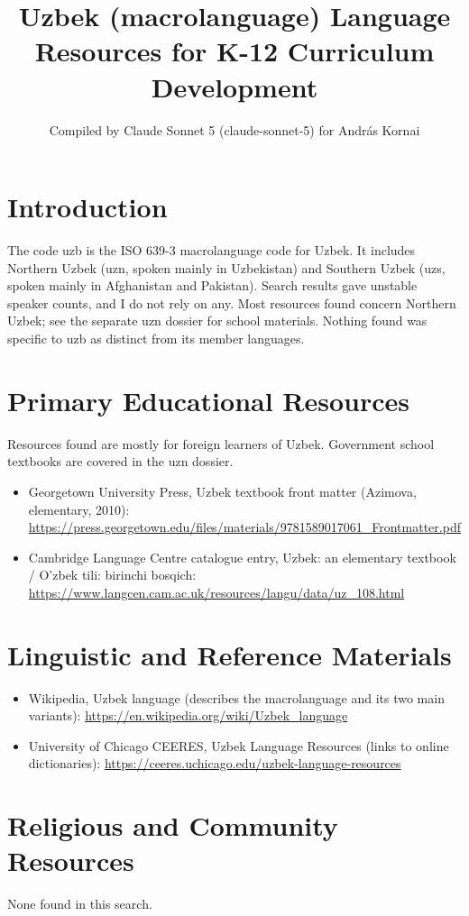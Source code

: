 \documentclass[12pt]{article}
\title{Uzbek (macrolanguage) Language Resources for K-12 Curriculum Development}
\author{Compiled by Claude Sonnet 5 (claude-sonnet-5) for Andr\'as Kornai}
\date{}
\begin{document}
\maketitle

\section{Introduction}
The code uzb is the ISO 639-3 macrolanguage code for Uzbek. It includes Northern Uzbek (uzn, spoken mainly in Uzbekistan) and Southern Uzbek (uzs, spoken mainly in Afghanistan and Pakistan). Search results gave unstable speaker counts, and I do not rely on any. Most resources found concern Northern Uzbek; see the separate uzn dossier for school materials. Nothing found was specific to uzb as distinct from its member languages.

\section{Primary Educational Resources}
Resources found are mostly for foreign learners of Uzbek. Government school textbooks are covered in the uzn dossier.
\begin{itemize}
\item Georgetown University Press, Uzbek textbook front matter (Azimova, elementary, 2010): \url{https://press.georgetown.edu/files/materials/9781589017061_Frontmatter.pdf}
\item Cambridge Language Centre catalogue entry, Uzbek: an elementary textbook / O'zbek tili: birinchi bosqich: \url{https://www.langcen.cam.ac.uk/resources/langu/data/uz_108.html}
\end{itemize}

\section{Linguistic and Reference Materials}
\begin{itemize}
\item Wikipedia, Uzbek language (describes the macrolanguage and its two main variants): \url{https://en.wikipedia.org/wiki/Uzbek_language}
\item University of Chicago CEERES, Uzbek Language Resources (links to online dictionaries): \url{https://ceeres.uchicago.edu/uzbek-language-resources}
\end{itemize}

\section{Religious and Community Resources}
None found in this search.
\end{document}
